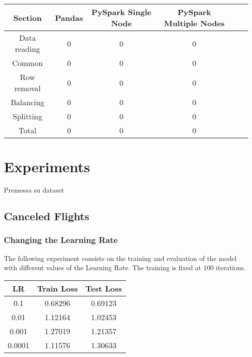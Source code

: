 \documentclass[
	letterpaper, %
	10pt, %
]{class}
\begin{document}
\begin{center}
	\begin{tabular}{ |c|c|c|c|c|c| }
		\hline
		Section      & Pandas & PySpark Single Node & PySpark Multiple Nodes \\
		\hline
		Data reading & 0      & 0                   & 0                      \\
		Common       & 0      & 0                   & 0                      \\
		Row removal  & 0      & 0                   & 0                      \\
		Balancing    & 0      & 0                   & 0                      \\
		Splitting    & 0      & 0                   & 0                      \\
		Total        & 0      & 0                   & 0                      \\

		\hline
	\end{tabular}
\end{center}


\section{Experiments}

Premessa su dataset

\subsection{Canceled Flights}

\subsubsection{Changing the Learning Rate}

The following experiment consists on the training and evaluation of the model with different values of the Learning Rate. The training is fixed at 100 iterations.

\begin{center}
	\begin{tabular}{ |c|c|c| }
		\hline
		LR     & Train Loss & Test Loss \\
		\hline
		0.1    & 0.68296    & 0.69123   \\
		0.01   & 1.12164    & 1.02453   \\
		0.001  & 1.27019    & 1.21357   \\
		0.0001 & 1.11576    & 1.30633   \\
		\hline
	\end{tabular}
\end{center}
\end{document}
